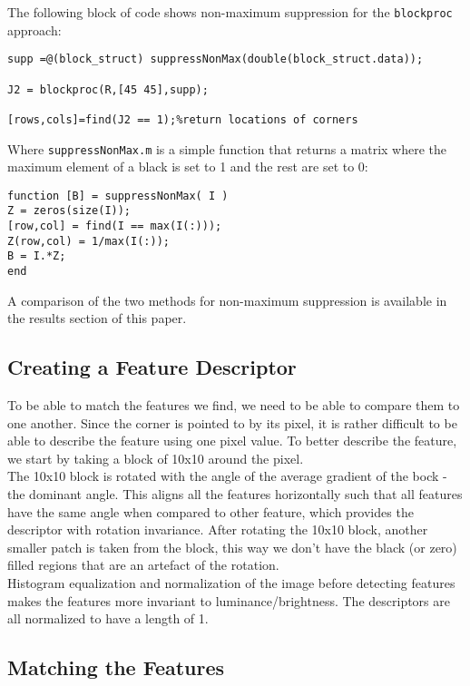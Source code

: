 \documentclass[10pt,twocolumn,letterpaper]{article}
\begin{document}
The following block of code shows non-maximum suppression for the \texttt{blockproc} approach: 

\begin{lstlisting}
supp =@(block_struct) suppressNonMax(double(block_struct.data));

J2 = blockproc(R,[45 45],supp);

[rows,cols]=find(J2 == 1);%return locations of corners
\end{lstlisting}


Where \texttt{suppressNonMax.m} is a simple function that returns a matrix where the maximum element of a black is set to 1 and the rest are set to 0:
\begin{lstlisting}
function [B] = suppressNonMax( I )
Z = zeros(size(I));
[row,col] = find(I == max(I(:)));
Z(row,col) = 1/max(I(:));
B = I.*Z;
end
\end{lstlisting}
A comparison of the two methods for non-maximum suppression is available in the results section of this paper.

\subsection{Creating a Feature Descriptor}

To be able to match the features we find, we need to be able to compare them to one another. Since the corner is pointed to by its pixel, it is rather difficult to be able to describe the feature using one pixel value. To better describe the feature, we start by taking a block of 10x10 around the pixel.\\
The 10x10 block is rotated with the angle of the average gradient of the bock - the dominant angle. This aligns all the features horizontally such that all features have the same angle when compared to other feature, which provides the descriptor with rotation invariance. After rotating the 10x10 block, another smaller patch is taken from the block, this way we don't have the black (or zero) filled regions that are an artefact of the rotation.\\
Histogram equalization and normalization of the image before detecting features makes the features more invariant to luminance/brightness. The descriptors are all normalized to have a length of 1.


\subsection{Matching the Features}
\end{document}
